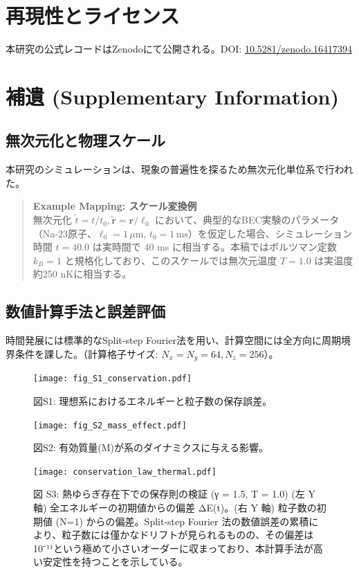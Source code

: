 \documentclass[a4paper,11pt,ja=standard,lualatex]{bxjsarticle}
\begin{document}
\section*{再現性とライセンス}
本研究の公式レコードはZenodoにて公開される。DOI: \url{10.5281/zenodo.16417394}

\FloatBarrier
\appendix
\section{補遺 (Supplementary Information)}
\subsection{無次元化と物理スケール}
本研究のシミュレーションは、現象の普遍性を探るため無次元化単位系で行われた。
\begin{quote}
\textbf{Example Mapping: スケール変換例} \\
無次元化 $\tilde t = t/t_0, \tilde{\mathbf{r}} = \mathbf{r}/\ell_0$ において、典型的なBEC実験のパラメータ（Na-23原子、$\ell_0 = 1\,\mu\text{m}$, $t_0 = 1\,\text{ms}$）を仮定した場合、シミュレーション時間 $t=40.0$ は実時間で 40 ms に相当する。本稿ではボルツマン定数 $k_B=1$ と規格化しており、このスケールでは無次元温度 $T=1.0$ は実温度約250 nKに相当する。
\end{quote}

\subsection{数値計算手法と誤差評価}
時間発展には標準的なSplit-step Fourier法を用い、計算空間には全方向に周期境界条件を課した。（計算格子サイズ: $N_x=N_y=64, N_z=256$）。

\begin{figure}[h!]
  \centering
  \texttt{[image: fig\_S1\_conservation.pdf]}
  \caption*{図S1: 理想系におけるエネルギーと粒子数の保存誤差。}
  \label{fig:s1_ideal}
\end{figure}

\begin{figure}[h!]
  \centering
  \texttt{[image: fig\_S2\_mass\_effect.pdf]}
  \caption*{図S2: 有効質量(M)が系のダイナミクスに与える影響。}
  \label{fig:s2_mass}
\end{figure}

\begin{figure}[h!]
  \centering
  \texttt{[image: conservation\_law\_thermal.pdf]}
  \caption*{図 S3: 熱ゆらぎ存在下での保存則の検証 (γ = 1.5, T = 1.0) (左 Y 軸) 全エネルギーの初期値からの偏差 ΔE(t)。(右 Y 軸) 粒子数の初期値 (N=1) からの偏差。Split-step Fourier 法の数値誤差の累積により、粒子数には僅かなドリフトが見られるものの、その偏差は10⁻¹¹という極めて小さいオーダーに収まっており、本計算手法が高い安定性を持つことを示している。}
  \label{fig:s3_thermal}
\end{figure}
\end{document}
